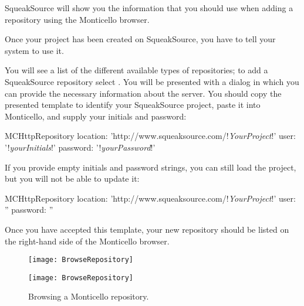 \documentclass[a4paper,10pt,twoside]{book}
\begin{document}
SqueakSource will show you the information that you should use when adding a repository using the Monticello browser. 

Once your project has been created on SqueakSource, you have to tell your \squeak system to use it. 

You will see a list of the different available types of repositories; to add a SqueakSource repository select .
You will be presented with a dialog in which you can provide the necessary information about the server.
You should copy the presented template to identify your SqueakSource project, paste it into Monticello, and supply your initials and password:

\begin{code}{}
MCHttpRepository
    location: 'http://www.squeaksource.com/!\emph{YourProject}!'
    user: '!\emph{yourInitials}!'
    password: '!\emph{yourPassword}!'
\end{code}

\noindent
If you provide empty initials and password strings, you can still load the project, but you will not be able to update it:

\begin{code}{}
MCHttpRepository
    location: 'http://www.squeaksource.com/!\emph{YourProject}!'
    user: ''
    password: ''
\end{code}

Once you have accepted this template, your new repository should be listed on the right-hand side of the Monticello browser.

\begin{figure}[hbt]
\ifluluelse
	{\centerline {\texttt{[image: BrowseRepository]}}}
	{\centerline {\texttt{[image: BrowseRepository]}}}
\caption{Browsing a Monticello repository.
\label{fig:monticello3}}
\end{figure}
\end{document}
